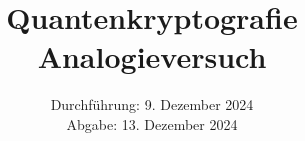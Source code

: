 

\subject{\texorpdfstring{\vspace{2ex}}{}V00\texorpdfstring{\vspace{-2ex}}{}} %
\title{Quantenkryptografie Analogieversuch} %
\date{
	Durchführung: 9. Dezember 2024 %
	\\ Abgabe: 13. Dezember 2024 %
}





\maketitle
\thispagestyle{empty}

\tableofcontents
\newpage








\printbibliography{}


